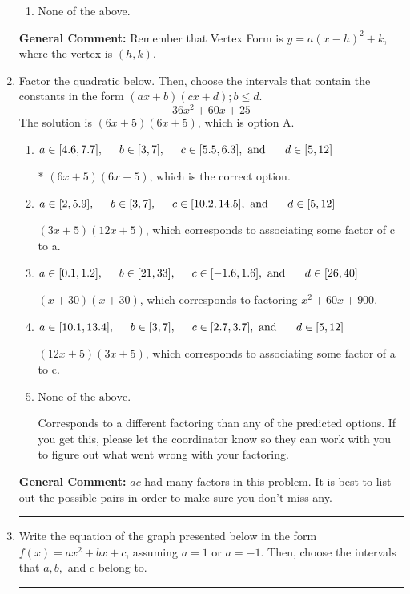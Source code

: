 \documentclass{extbook}[14pt]
\newcommand{\litem}[1]{\item #1

\rule{\textwidth}{0.4pt}}
\begin{document}
\begin{enumerate}
{\begin{enumerate}[label=\Alph*.]
\begin{multicols}{2}
\end{multicols}\item None of the above.\end{enumerate}
\textbf{General Comment:} Remember that Vertex Form is $y = a(x-h)^2+k$, where the vertex is $(h, k)$.
}
\litem{
Factor the quadratic below. Then, choose the intervals that contain the constants in the form $(ax+b)(cx+d); b \leq d.$
\[ 36x^{2} +60 x + 25 \]The solution is \( (6x + 5)(6x + 5) \), which is option A.\begin{enumerate}[label=\Alph*.]
\item \( a \in [4.6, 7.7], \hspace*{5mm} b \in [3, 7], \hspace*{5mm} c \in [5.5, 6.3], \text{ and } \hspace*{5mm} d \in [5, 12] \)

* $(6x + 5)(6x + 5)$, which is the correct option.
\item \( a \in [2, 5.9], \hspace*{5mm} b \in [3, 7], \hspace*{5mm} c \in [10.2, 14.5], \text{ and } \hspace*{5mm} d \in [5, 12] \)

 $(3x + 5)(12x + 5)$, which corresponds to associating some factor of c to a.
\item \( a \in [0.1, 1.2], \hspace*{5mm} b \in [21, 33], \hspace*{5mm} c \in [-1.6, 1.6], \text{ and } \hspace*{5mm} d \in [26, 40] \)

 $(x + 30)(x + 30)$, which corresponds to factoring $x^{2} +60 x + 900$.
\item \( a \in [10.1, 13.4], \hspace*{5mm} b \in [3, 7], \hspace*{5mm} c \in [2.7, 3.7], \text{ and } \hspace*{5mm} d \in [5, 12] \)

 $(12x + 5)(3x + 5)$, which corresponds to associating some factor of a to c.
\item \( \text{None of the above.} \)

 Corresponds to a different factoring than any of the predicted options. If you get this, please let the coordinator know so they can work with you to figure out what went wrong with your factoring.
\end{enumerate}

\textbf{General Comment:} $ac$ had many factors in this problem. It is best to list out the possible pairs in order to make sure you don't miss any.
}
\litem{
Write the equation of the graph presented below in the form $f(x)=ax^2+bx+c$, assuming  $a=1$ or $a=-1$. Then, choose the intervals that $a, b,$ and $c$ belong to.

}
\end{enumerate}
\end{document}
